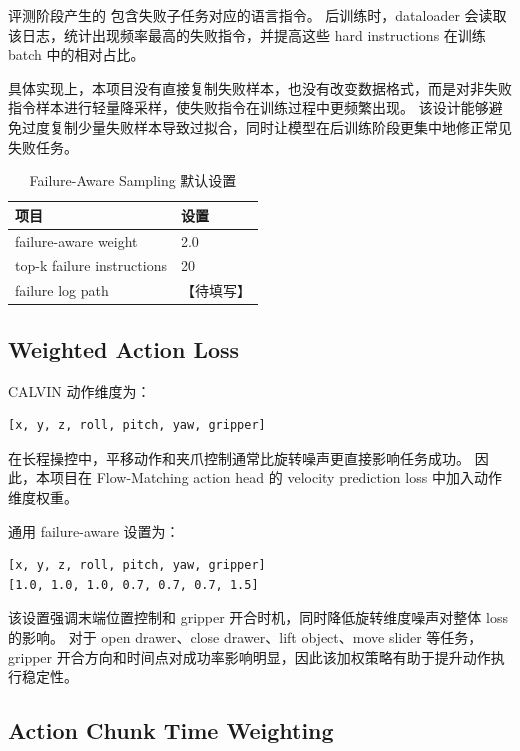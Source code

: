 \documentclass[10pt,a4paper,fontset=none]{ctexart}
\newcommand{\todo}[1]{\textcolor{TodoRed}{【#1】}}
\newcommand{\code}[1]{\texttt{\detokenize{#1}}}
\newcommand{\FailureAwareWeight}{2.0}
\newcommand{\FailureTopK}{20}
\begin{document}
评测阶段产生的 \code{failure_log.jsonl} 包含失败子任务对应的语言指令。
后训练时，dataloader 会读取该日志，统计出现频率最高的失败指令，并提高这些 hard instructions 在训练 batch 中的相对占比。

具体实现上，本项目没有直接复制失败样本，也没有改变数据格式，而是对非失败指令样本进行轻量降采样，使失败指令在训练过程中更频繁出现。
该设计能够避免过度复制少量失败样本导致过拟合，同时让模型在后训练阶段更集中地修正常见失败任务。

\begin{table}[H]
\centering
\caption{Failure-Aware Sampling 默认设置}
\begin{tabularx}{0.75\textwidth}{lX}
\toprule
项目 & 设置 \\
\midrule
failure-aware weight & \FailureAwareWeight{} \\
top-k failure instructions & \FailureTopK{} \\
failure log path & \todo{待填写} \\
\bottomrule
\end{tabularx}
\end{table}

\subsection{Weighted Action Loss}

CALVIN 动作维度为：

\begin{lstlisting}[caption={CALVIN action dimension}]
[x, y, z, roll, pitch, yaw, gripper]
\end{lstlisting}

在长程操控中，平移动作和夹爪控制通常比旋转噪声更直接影响任务成功。
因此，本项目在 Flow-Matching action head 的 velocity prediction loss 中加入动作维度权重。

通用 failure-aware 设置为：

\begin{lstlisting}[caption={通用动作维度权重}]
[x, y, z, roll, pitch, yaw, gripper]
[1.0, 1.0, 1.0, 0.7, 0.7, 0.7, 1.5]
\end{lstlisting}

该设置强调末端位置控制和 gripper 开合时机，同时降低旋转维度噪声对整体 loss 的影响。
对于 open drawer、close drawer、lift object、move slider 等任务，gripper 开合方向和时间点对成功率影响明显，因此该加权策略有助于提升动作执行稳定性。

\subsection{Action Chunk Time Weighting}
\end{document}
